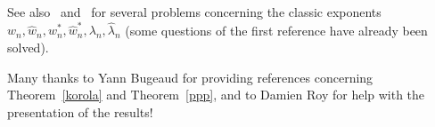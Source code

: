 \documentclass[12pt]{amsart}
\theoremstyle{definition}
\begin{document}
See also~\cite[Section~10.2]{bugbuch} and~\cite{bdraft} for
several problems concerning the classic exponents $w_{n}, \widehat{w}_{n}, w_{n}^{\ast}, \widehat{w}_{n}^{\ast}, \lambda_{n}, \widehat{\lambda}_{n}$
(some questions of the first reference have already been solved).


\vspace{0.5cm}

Many 
thanks to Yann Bugeaud for providing references concerning Theorem~\ref{korola} and Theorem~\ref{ppp},
and to Damien Roy for help with the presentation of the results!
\end{document}
